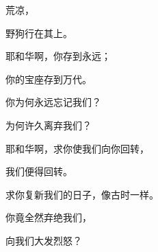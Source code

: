 {\par }{\Q {}荒凉，
\par }{\Q 野狗行在其上。
\par }{\BB \par }{\Q {}耶和华啊，你存到永远；
\par }{\Q 你的宝座存到万代。
\par }{\Q {}你为何永远忘记我们？
\par }{\Q 为何许久离弃我们？
\par }{\Q {}耶和华啊，求你使我们向你回转，
\par }{\Q 我们便得回转。
\par }{\Q 求你复新我们的日子，像古时一样。
\par }{\Q {}你竟全然弃绝我们，
\par }{\Q 向我们大发烈怒？
\par }